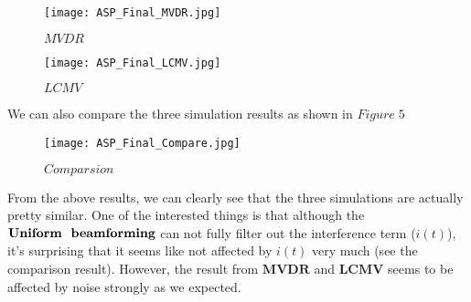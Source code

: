 \documentclass[11pt]{article}
\begin{document}
\begin{figure}[h]
    \centering
    \texttt{[image: ASP\_Final\_MVDR.jpg]} 
    \caption{$MVDR$}
\end{figure}
\newpage
\begin{figure}[h]
    \centering
    \texttt{[image: ASP\_Final\_LCMV.jpg]} 
    \caption{$LCMV$}
\end{figure}
We can also compare the three simulation results as shown in $Figure\;5$\newline
\begin{figure}[h]
    \centering
    \texttt{[image: ASP\_Final\_Compare.jpg]} 
    \caption{$Comparsion$}
\end{figure}
From the above results, we can clearly see that the three simulations are actually pretty similar.\newline
One of the interested things is that although the $\textbf{Uniform \;beamforming}$ can not fully filter out the interference term ($i(t)$), it's surprising that it seems like not affected by $i(t)$ very much (see the comparison result). However, the result from $\textbf{MVDR}$ and $\textbf{LCMV}$ seems to be affected by noise 
strongly as we expected.\newline
\end{document}
